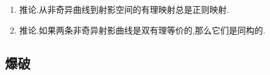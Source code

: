\begin{enumerate}
\begin{proof}
    	我们解释过有理映射的非正则点构成闭子集.这个命题是局部的,所以不妨设$X$是非奇异仿射簇.可记$\varphi=(f_0:\cdots:f_n)$,其中$f_i\in k(X)$.取$x\in X$,我们可以适当乘以一个合适的有理函数使得全体$f_i\in\mathscr{O}_{X,x}$,并且它们在$\mathscr{O}_{X,x}$中没有公因式.现在$\varphi$的非正则点恰好是$f_0=\cdots=f_n=0$的零点集,记作$Y$.如果$Y$是余维数1的,那么可取局部方程$I_{Y,x}=(g)$,但是有$I(Y)=(f_0,f_1,\cdots,f_n)\subseteq I_{Y,x}=(g)$,导致$\{g_i\}$在$\mathscr{O}_{X,x}$中有公因式$g$,这矛盾.命题得证.
    \end{proof}
    \item 推论.从非奇异曲线到射影空间的有理映射总是正则映射.
    \item 推论.如果两条非奇异射影曲线是双有理等价的,那么它们是同构的.
\end{enumerate}

\newpage
\subsection{爆破}

